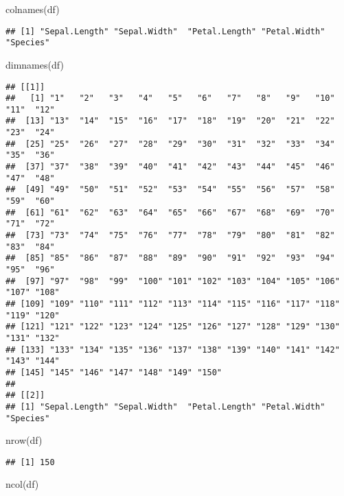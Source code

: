 \documentclass[
]{article}
\newenvironment{Shaded}{\begin{snugshade}}{\end{snugshade}}
\newcommand{\FunctionTok}[1]{\textcolor[rgb]{0.00,0.00,0.00}{#1}}
\newcommand{\NormalTok}[1]{#1}
\begin{document}
\begin{Shaded}
\begin{Highlighting}[]
\FunctionTok{colnames}\NormalTok{(df)}
\end{Highlighting}
\end{Shaded}

\begin{verbatim}
## [1] "Sepal.Length" "Sepal.Width"  "Petal.Length" "Petal.Width"  "Species"
\end{verbatim}

\begin{Shaded}
\begin{Highlighting}[]
\FunctionTok{dimnames}\NormalTok{(df)}
\end{Highlighting}
\end{Shaded}

\begin{verbatim}
## [[1]]
##   [1] "1"   "2"   "3"   "4"   "5"   "6"   "7"   "8"   "9"   "10"  "11"  "12" 
##  [13] "13"  "14"  "15"  "16"  "17"  "18"  "19"  "20"  "21"  "22"  "23"  "24" 
##  [25] "25"  "26"  "27"  "28"  "29"  "30"  "31"  "32"  "33"  "34"  "35"  "36" 
##  [37] "37"  "38"  "39"  "40"  "41"  "42"  "43"  "44"  "45"  "46"  "47"  "48" 
##  [49] "49"  "50"  "51"  "52"  "53"  "54"  "55"  "56"  "57"  "58"  "59"  "60" 
##  [61] "61"  "62"  "63"  "64"  "65"  "66"  "67"  "68"  "69"  "70"  "71"  "72" 
##  [73] "73"  "74"  "75"  "76"  "77"  "78"  "79"  "80"  "81"  "82"  "83"  "84" 
##  [85] "85"  "86"  "87"  "88"  "89"  "90"  "91"  "92"  "93"  "94"  "95"  "96" 
##  [97] "97"  "98"  "99"  "100" "101" "102" "103" "104" "105" "106" "107" "108"
## [109] "109" "110" "111" "112" "113" "114" "115" "116" "117" "118" "119" "120"
## [121] "121" "122" "123" "124" "125" "126" "127" "128" "129" "130" "131" "132"
## [133] "133" "134" "135" "136" "137" "138" "139" "140" "141" "142" "143" "144"
## [145] "145" "146" "147" "148" "149" "150"
## 
## [[2]]
## [1] "Sepal.Length" "Sepal.Width"  "Petal.Length" "Petal.Width"  "Species"
\end{verbatim}

\begin{Shaded}
\begin{Highlighting}[]
\FunctionTok{nrow}\NormalTok{(df)}
\end{Highlighting}
\end{Shaded}

\begin{verbatim}
## [1] 150
\end{verbatim}

\begin{Shaded}
\begin{Highlighting}[]
\FunctionTok{ncol}\NormalTok{(df)}
\end{Highlighting}
\end{Shaded}
\end{document}
